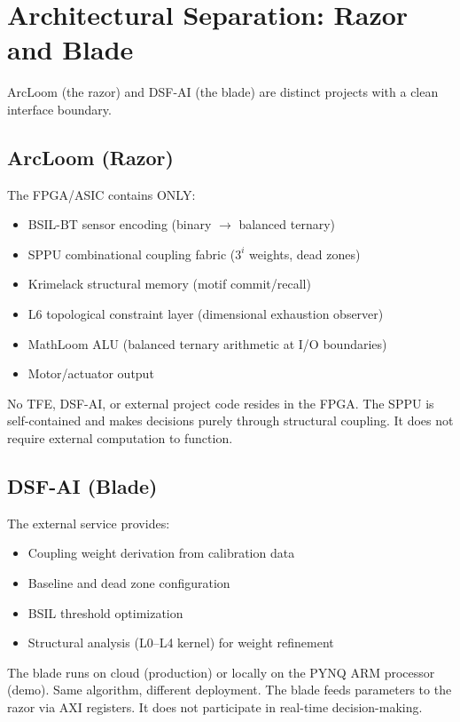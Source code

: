 \documentclass[11pt, a4paper]{article}
\begin{document}
\section{Architectural Separation: Razor and Blade}

ArcLoom (the razor) and DSF-AI (the blade) are distinct projects
with a clean interface boundary.

\subsection{ArcLoom (Razor)}

The FPGA/ASIC contains ONLY:
\begin{itemize}[nosep]
  \item BSIL-BT sensor encoding (binary $\rightarrow$ balanced ternary)
  \item SPPU combinational coupling fabric ($3^i$ weights, dead zones)
  \item Krimelack structural memory (motif commit/recall)
  \item L6 topological constraint layer (dimensional exhaustion observer)
  \item MathLoom ALU (balanced ternary arithmetic at I/O boundaries)
  \item Motor/actuator output
\end{itemize}

No TFE, DSF-AI, or external project code resides in the FPGA.
The SPPU is self-contained and makes decisions purely through
structural coupling. It does not require external computation
to function.

\subsection{DSF-AI (Blade)}

The external service provides:
\begin{itemize}[nosep]
  \item Coupling weight derivation from calibration data
  \item Baseline and dead zone configuration
  \item BSIL threshold optimization
  \item Structural analysis (L0--L4 kernel) for weight refinement
\end{itemize}

The blade runs on cloud (production) or locally on the PYNQ ARM
processor (demo). Same algorithm, different deployment. The blade
feeds parameters to the razor via AXI registers. It does not
participate in real-time decision-making.
\end{document}
